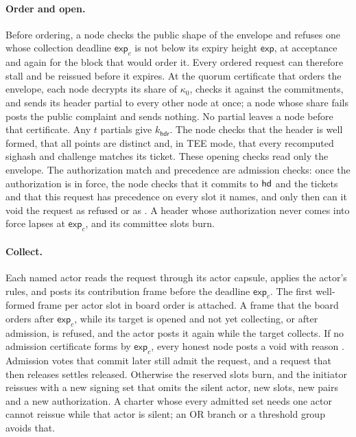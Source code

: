 \paragraph{Order and open.} Before ordering, a node checks the public shape of the envelope and refuses one whose collection deadline $\mathsf{exp}_c$ is not below its expiry height $\mathsf{exp}$, at acceptance and again for the block that would order it. Every ordered request can therefore stall and be reissued before it expires. At the quorum certificate that orders the envelope, each node decrypts its share of $\kappa_0$, checks it against the commitments, and sends its header partial to every other node at once; a node whose share fails posts the public complaint and sends nothing. No partial leaves a node before that certificate. Any $t$ partials give $k_{\mathsf{hdr}}$. The node checks that the header is well formed, that all points are distinct and, in TEE mode, that every recomputed sighash and challenge matches its ticket. These opening checks read only the envelope. The authorization match and precedence are admission checks: once the authorization is in force, the node checks that it commits to $\mathsf{hd}$ and the tickets and that this request has precedence on every slot it names, and only then can it void the request as refused or as . A header whose authorization never comes into force lapses at $\mathsf{exp}_c$, and its committee slots burn.

\paragraph{Collect.} Each named actor reads the request through its actor capsule, applies the actor's rules, and posts its contribution frame before the deadline $\mathsf{exp}_c$. The first well-formed frame per actor slot in board order is attached. A frame that the board orders after $\mathsf{exp}_c$, while its target is opened and not yet collecting, or after admission, is refused, and the actor posts it again while the target collects. If no admission certificate forms by $\mathsf{exp}_c$, every honest node posts a void with reason . Admission votes that commit later still admit the request, and a request that then releases settles released. Otherwise the reserved slots burn, and the initiator reissues with a new signing set that omits the silent actor, new slots, new pairs and a new authorization. A charter whose every admitted set needs one actor cannot reissue while that actor is silent; an OR branch or a threshold group avoids that.

